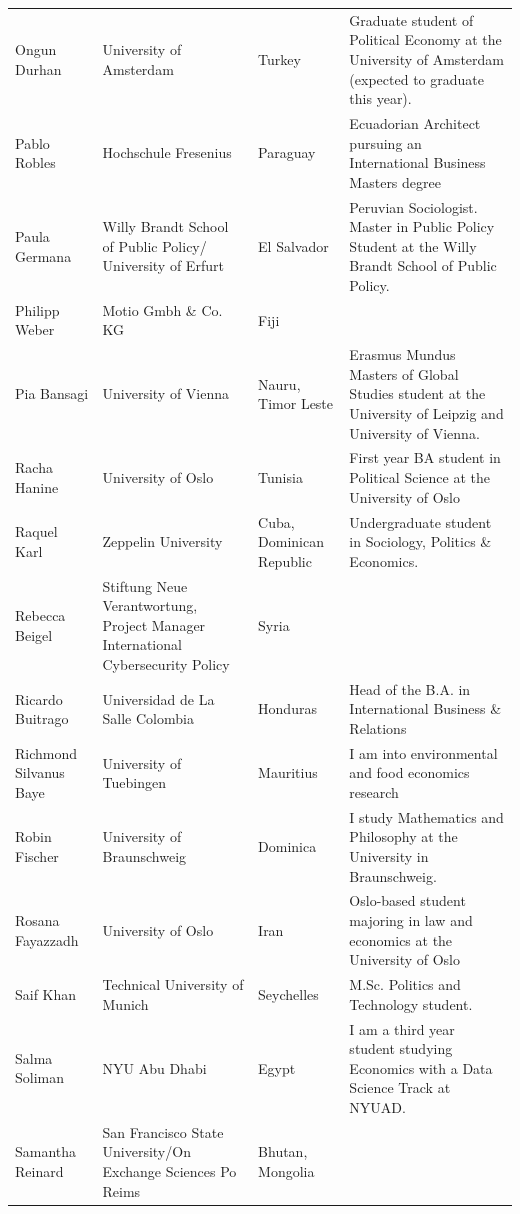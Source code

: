 \documentclass[]{article}
\begin{document}
\begin{longtable}{l>{\raggedright\arraybackslash}p{2cm}>{\raggedright\arraybackslash}p{2cm}>{\raggedright\arraybackslash}p{3cm}}
\rowcolor{gray!6}  Ongun Durhan & University of Amsterdam & Turkey & Graduate student of Political Economy at the University of Amsterdam (expected to graduate this year).\\
Pablo Robles & Hochschule Fresenius & Paraguay & Ecuadorian Architect pursuing an International Business Masters degree\\
\rowcolor{gray!6}  Paula Germana & Willy Brandt School of Public Policy/ University of Erfurt & El Salvador & Peruvian Sociologist. Master in Public Policy Student at the Willy Brandt School of Public Policy.\\
\addlinespace
Philipp Weber & Motio Gmbh \& Co. KG & Fiji & \\
\rowcolor{gray!6}  Pia Bansagi & University of Vienna & Nauru, Timor Leste & Erasmus Mundus Masters of Global Studies student at the University of Leipzig and University of Vienna.\\
Racha Hanine & University of Oslo & Tunisia & First year BA student in Political Science at the University of Oslo\\
\rowcolor{gray!6}  Raquel Karl & Zeppelin University & Cuba, Dominican Republic & Undergraduate student in Sociology, Politics \& Economics.\\
Rebecca Beigel & Stiftung Neue Verantwortung, Project Manager International Cybersecurity Policy & Syria & \\
\addlinespace
\rowcolor{gray!6}  Ricardo Buitrago & Universidad de La Salle Colombia & Honduras & Head of the B.A. in International Business \& Relations\\
Richmond Silvanus Baye & University of Tuebingen & Mauritius & I am into environmental and food economics research\\
\rowcolor{gray!6}  Robin Fischer & University of Braunschweig & Dominica & I study Mathematics and Philosophy at the University in Braunschweig.\\
Rosana Fayazzadh & University of Oslo & Iran & Oslo-based student majoring in law and economics at the University of Oslo\\
\rowcolor{gray!6}  Saif Khan & Technical University of Munich & Seychelles & M.Sc. Politics and Technology student.\\
\addlinespace
Salma Soliman & NYU Abu Dhabi & Egypt & I am a third year student studying Economics with a Data Science Track at NYUAD.\\
\rowcolor{gray!6}  Samantha Reinard & San Francisco State University/On Exchange Sciences Po Reims & Bhutan, Mongolia & \\

\end{longtable}
\end{document}
